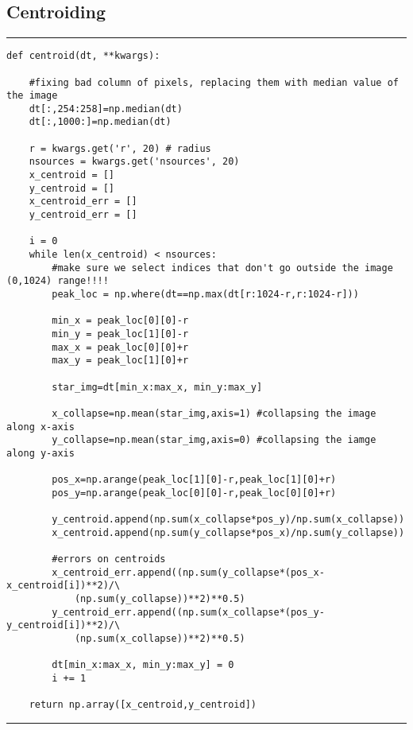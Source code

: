 \documentclass[preprint]{aastex62}
\begin{document}
\subsection{Centroiding} \label{code:centroid}
\hrule
\begin{lstlisting}
def centroid(dt, **kwargs):

    #fixing bad column of pixels, replacing them with median value of the image
    dt[:,254:258]=np.median(dt) 
    dt[:,1000:]=np.median(dt) 

    r = kwargs.get('r', 20) # radius
    nsources = kwargs.get('nsources', 20)
    x_centroid = []
    y_centroid = []
    x_centroid_err = []
    y_centroid_err = []

    i = 0
    while len(x_centroid) < nsources:
        #make sure we select indices that don't go outside the image (0,1024) range!!!!
        peak_loc = np.where(dt==np.max(dt[r:1024-r,r:1024-r]))
        
        min_x = peak_loc[0][0]-r
        min_y = peak_loc[1][0]-r
        max_x = peak_loc[0][0]+r
        max_y = peak_loc[1][0]+r
            
        star_img=dt[min_x:max_x, min_y:max_y]

        x_collapse=np.mean(star_img,axis=1) #collapsing the image along x-axis
        y_collapse=np.mean(star_img,axis=0) #collapsing the iamge along y-axis

        pos_x=np.arange(peak_loc[1][0]-r,peak_loc[1][0]+r) 
        pos_y=np.arange(peak_loc[0][0]-r,peak_loc[0][0]+r) 

        y_centroid.append(np.sum(x_collapse*pos_y)/np.sum(x_collapse)) 
        x_centroid.append(np.sum(y_collapse*pos_x)/np.sum(y_collapse)) 

        #errors on centroids
        x_centroid_err.append((np.sum(y_collapse*(pos_x-x_centroid[i])**2)/\
            (np.sum(y_collapse))**2)**0.5) 
        y_centroid_err.append((np.sum(x_collapse*(pos_y-y_centroid[i])**2)/\
            (np.sum(x_collapse))**2)**0.5)

        dt[min_x:max_x, min_y:max_y] = 0
        i += 1
        
    return np.array([x_centroid,y_centroid])
\end{lstlisting}
\hrule \vspace{7pt}
\end{document}
